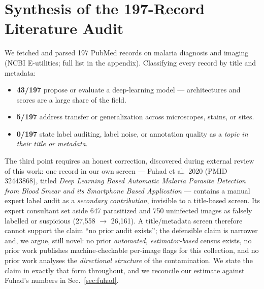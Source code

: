 
\section{Synthesis of the 197-Record Literature Audit}
\label{sec:litsynth}
We fetched and parsed 197 PubMed records on malaria diagnosis and imaging
(NCBI E-utilities; full list in the appendix). Classifying every record by
title and metadata:
\begin{itemize}
\item \textbf{43/197} propose or evaluate a deep-learning model ---
architectures and scores are a large share of the field.
\item \textbf{5/197} address transfer or generalization across
microscopes, stains, or sites.
\item \textbf{0/197} state label auditing, label noise, or annotation
quality as a \emph{topic in their title or metadata}.
\end{itemize}
The third point requires an honest correction, discovered during external
review of this work: one record in our own screen --- Fuhad et al.\ 2020
(PMID 32443868), titled \emph{Deep Learning Based Automatic Malaria
Parasite Detection from Blood Smear and its Smartphone Based Application}
--- contains a manual expert label audit as a \emph{secondary
contribution}, invisible to a title-based screen. Its expert consultant
set aside 647 parasitized and 750 uninfected images as falsely labelled
or suspicious (27{,}558 $\to$ 26{,}161). A title/metadata screen
therefore cannot support the claim ``no prior audit exists''; the
defensible claim is narrower and, we argue, still novel: no prior
\emph{automated, estimator-based} census exists, no prior work publishes
machine-checkable per-image flags for this collection, and no prior work
analyses the \emph{directional structure} of the contamination. We state
the claim in exactly that form throughout, and we reconcile our estimate
against Fuhad's numbers in Sec.~\ref{sec:fuhad}.
